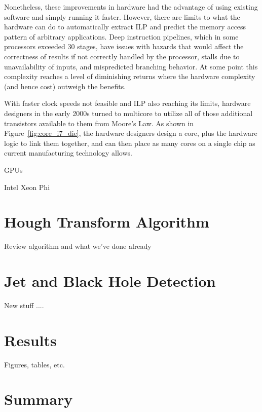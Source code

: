 \documentclass{JINST}
\begin{document}
Nonetheless, these improvements in hardware had the advantage of using existing software and simply running it faster.  However, there are limits to what the hardware can do to automatically extract ILP and predict the memory access pattern of arbitrary applications.  Deep instruction pipelines, which in some processors exceeded 30 stages, have issues with hazards that would affect the correctness of results if not correctly handled by the processor, stalls due to unavailability of inputs, and mispredicted branching behavior.  At some point this complexity reaches a level of diminishing returns where the hardware complexity (and hence cost) outweigh the benefits.

With faster clock speeds not feasible and ILP also reaching its limits, hardware designers in the early 2000s turned to multicore to utilize all of those additional transistors available to them from Moore's Law.  As shown in Figure~\ref{fig:core_i7_die}, the hardware designers design a core, plus the hardware logic to link them together, and can then place as many cores on a single chip as current manufacturing technology allows.



GPUs

Intel Xeon Phi


\section{Hough Transform Algorithm}

Review algorithm and what we've done already

\section{Jet and Black Hole Detection}

New stuff ....

\section{Results}

Figures, tables, etc.

\section{Summary}
\end{document}
